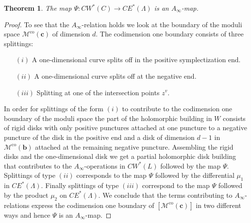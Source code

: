 \documentclass{gtpart}
\newtheorem{thm}{Theorem}
\renewcommand{\co}{\mathrm{co}}
\begin{document}
\begin{thm}\label{t:newsurgeryAinfty}
The map $\Psi\colon CW^{\ast}(C)\to CE^{\ast}(\Lambda)$ is an $A_{\infty}$-map.
\end{thm}

\begin{proof}
To see that the $A_{\infty}$-relation holds we look at the boundary of the moduli space $\mathcal{M}^{\co}(\mathbf{c})$ of dimension $d$. The codimension one boundary consists of three splittings:
\begin{itemize}
	\item[$(i)$] A one-dimensional curve splits off in the positive symplectization end.
	\item[$(ii)$] A one-dimensional curve splits off at the negative end.
	\item[$(iii)$] Splitting at one of the intersection points $z^{v}$. 
\end{itemize}
In order for splittings of the form $(i)$ to contribute to the codimension one boundary of the moduli space the part of the holomorphic building in $W$ consists of rigid disks with only positive punctures attached at one puncture to a negative puncture of the disk in the positive end and a disk of dimension $d-1$ in $\mathcal{M}^{\co}(\mathbf{b})$ attached at the remaining negative puncture. Assembling the rigid disks and the one-dimensional disk we get a partial holomorphic disk building that contributes to the $A_{\infty}$-operations in $CW^{\ast}(L)$ followed by the map $\Psi$. Splittings of type $(ii)$ corresponds to the map $\Psi$ followed by the differential $\mu_{1}$ in $CE^{\ast}(\Lambda)$. Finally splittings of type $(iii)$ correspond to the map $\Psi$ followed by the product $\mu_{2}$ on $CE^{\ast}(\Lambda)$. We conclude that the terms contributing to $A_{\infty}$-relations express the codimension one boundary of $[\mathcal{M}^{\co}(\mathbf{c})]$ in two different ways and hence $\Psi$ is an $A_{\infty}$-map.
\end{proof}
\end{document}
